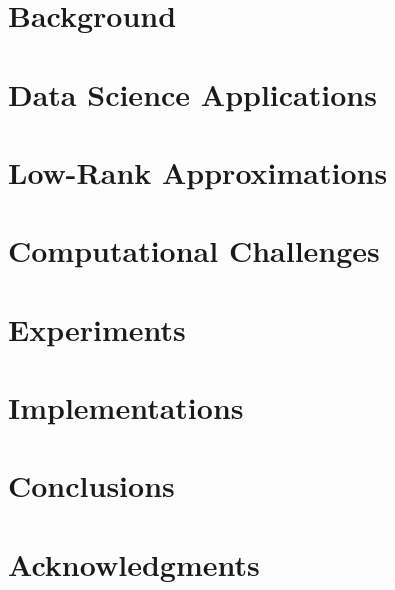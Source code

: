 \documentclass[leqno,onefignum,onetabnum]{siamltex1213}
\begin{document}
\section{Background}                \label{sec:background}
                                    
\section{Data Science Applications} \label{sec:applications}
                                    
\section{Low-Rank Approximations}   \label{sec:lowrank}
                                    
\section{Computational Challenges}  \label{sec:challenges}
                                    
\section{Experiments}               \label{sec:experiments}
                                    
\section{Implementations}           \label{sec:implementations}
                                    
\section{Conclusions}               \label{sec:conclusions}
                                    
\section{Acknowledgments}           \label{sec:acknowledgments}
                                    
 

\end{document}
